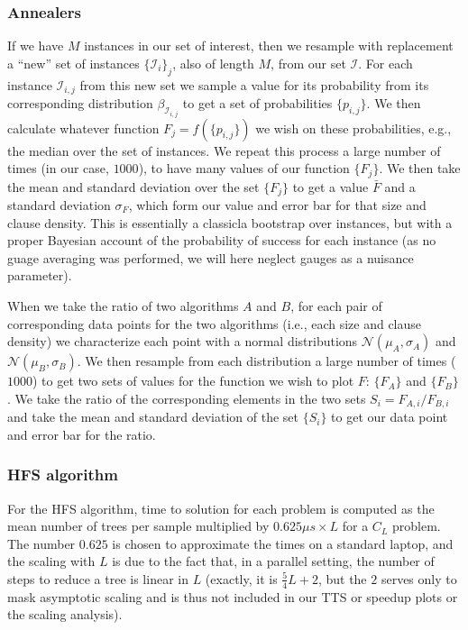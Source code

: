 \subsubsection{Annealers}
If we have $M$ instances in our set of interest, then we resample with replacement a ``new'' set of instances $\{\mathcal{I}_i\}_j$, also of length $M$, from our set $\mathcal{I}$. For each instance $\mathcal{I}_{i,j}$ from this new set we sample a value for its probability from its corresponding distribution $\beta_{\mathcal{I}_{i,j}}$ to get a set of probabilities $\{p_{i,j}\}$. We then calculate whatever function $F_j = f(\{p_{i,j}\})$ we wish on these probabilities, e.g., the median over the set of instances. We repeat this process a large number of times (in our case, $1000$), to have many values of our function $\{F_j\}$. We then take the mean and standard deviation over the set $\{F_j\}$ to get a value $\bar{F}$ and a standard deviation $\sigma_F$, which form our value and error bar for that size and clause density. This is essentially a classicla bootstrap over instances, but with a proper Bayesian account of the probability of success for each instance (as no guage averaging was performed, we will here neglect gauges as a nuisance parameter).

When we take the ratio of two algorithms $A$ and $B$, for each pair of corresponding data points for the two algorithms (i.e., each size and clause density) we characterize each point with a normal distributions $\mathcal{N}(\mu_A,\sigma_A)$ and $\mathcal{N}(\mu_B,\sigma_B)$. We then resample from each distribution a large number of times ($1000$) to get two sets of values for the function we wish to plot $F$:  $\{F_A\}$ and $\{F_B\}$. We take the ratio of the corresponding elements in the two sets $S_i = F_{A,i} / F_{B,i}$ and take the mean and standard deviation of the set $\{S_i\}$ to get our data point and error bar for the ratio.

\subsubsection{HFS algorithm}
\label{subsec:HFS}
For the HFS algorithm, time to solution for each problem is computed as the mean number of trees per sample multiplied by $0.625\mu s \times L$ for a $C_L$ problem. The number $0.625$ is chosen to approximate the times on a standard laptop, and the scaling with $L$ is due to the fact that, in a parallel setting, the number of steps to reduce a tree is linear in $L$ (exactly, it is $\frac 54 L+2$, but the $2$ serves only to mask asymptotic scaling and is thus not included in our TTS or speedup plots or the scaling analysis).

